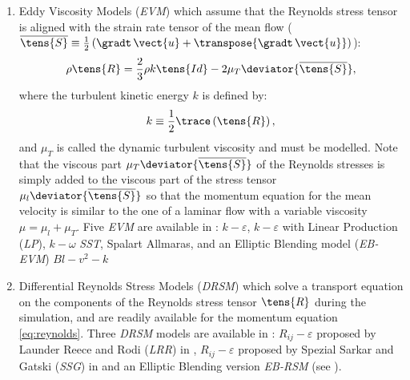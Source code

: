 \begin{enumerate}[ label=\roman{*}/, ref=(\roman{*})]
\item Eddy Viscosity Models (\emph{EVM}) which assume that the Reynolds stress tensor is aligned with
the strain rate tensor of the mean flow ($\overline{\tens{S}} \equiv \frac{1}{2} \left( \gradt \, \vect{u}+ \transpose{\gradt \, \vect{u}} \right)$):
%
\begin{equation}\label{eq:goveqn:evm_hypothesis}
\rho \tens{R} = \dfrac{2}{3}\rho  k \tens{Id} - 2 \mu_T \deviator{\overline{\tens{S}}},
\end{equation}
where the turbulent kinetic energy $k$ is defined by:
%
\begin{equation}\label{eq:goveqn:tke_def}
k \equiv \dfrac{1}{2} \trace \left( \tens{R}\right),
\end{equation}
and $\mu_T$ is called the dynamic turbulent viscosity and must be modelled.
Note that the viscous part $\mu_T\deviator{\overline{\tens{S}}}$ of the Reynolds stresses is simply added to the viscous part of the
stress tensor $\mu_l\deviator{\overline{\tens{S}}}$ so that the momentum equation for the mean velocity is similar to the one of a laminar
flow with a variable viscosity $\mu = \mu_l +\mu_T$. 
 Five \emph{EVM} are available in \CS:
$k-\varepsilon$, $k-\varepsilon$ with Linear Production (\emph{LP}), $k-\omega$ \emph{SST}, Spalart Allmaras, and an Elliptic Blending model (\emph{EB-EVM}) $Bl-v^2-k$ 

\item Differential Reynolds Stress Models (\emph{DRSM}) which solve
a transport equation on the components of the Reynolds stress tensor $\tens{R}$ 
during the simulation, and are readily available for the momentum
equation \eqref{eq:reynolds}. Three \emph{DRSM} models are available in \CS: $R_{ij}-\varepsilon$ proposed by Launder Reece and Rodi (\emph{LRR}) in \cite{launder:},
$R_{ij}-\varepsilon$ proposed by Spezial Sarkar and Gatski (\emph{SSG}) in \cite{spezial:} and an Elliptic Blending version \emph{EB-RSM} (see \cite{}).
%

\end{enumerate}


